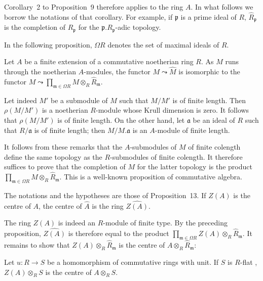 Corollary~2 to Proposition~9 therefore applies to the ring $A$. In
what follows we borrow the notations of that corollary. For example,
if $\mathfrak{p}$ is a prime ideal of $R$, $\hat R_{\mathfrak{p}}$ is
the completion of $R_{\mathfrak{p}}$ for the
$\mathfrak{p}.R_{\mathfrak{p}}$-adic topology.

In the following proposition, $\Omega R$ denotes the set of maximal
ideals of $R$.

\begin{proposition}
Let $A$ be a finite extension of a commutative noetherian ring $R$.
As $M$ runs through the noetherian $A$-modules, the functor
$M\leadsto\hat M$ is isomorphic to the functor
$M\leadsto\prod_{\mathfrak{m}\in\Omega R}M\otimes_R
\hat R_{\mathfrak{m}}$.
\end{proposition}

Let indeed $M'$ be a submodule of $M$ such that $M/M'$ is of finite
length. Then $\rho(M/M')$ is a noetherian $R$-module whose Krull
dimension is zero. It follows that $\rho(M/M')$ is of finite length.
On the other hand, let $\mathfrak{a}$ be an ideal of $R$ such that
$R/\mathfrak{a}$ is of finite length; then $M/M.\mathfrak{a}$ is an
$A$-module of finite length.

It follows from these remarks that the $A$-submodules of $M$ of finite
colength define the same topology as the $R$-submodules of finite
colength. It therefore suffices to prove that the completion of $M$
for the latter topology is the product
$\prod_{\mathfrak{m}\in\Omega R}M\otimes_R\hat R_{\mathfrak{m}}$.
This is a well-known proposition of commutative algebra.

\begin{corollary}
The notations and the hypotheses are those of Proposition~13. If
$Z(A)$ is the centre of $A$, the centre of $\hat A$ is the ring
$\widehat{Z(A)}$.
\end{corollary}

The ring $Z(A)$ is indeed an $R$-module of finite type. By the
preceding proposition, $\widehat{Z(A)}$ is therefore equal to the
product
$\prod_{\mathfrak{m}\in\Omega R}Z(A)\otimes_R\hat R_{\mathfrak{m}}$.
It remains to show that $Z(A)\otimes_R\hat R_{\mathfrak{m}}$ is the
centre of $A\otimes_R\hat R_{\mathfrak{m}}$:

\begin{lemma}
Let $u:R\to S$ be a homomorphism of commutative rings with unit. If
$S$ is $R$-flat \cite{lesieur-croisot-1}, $Z(A)\otimes_RS$ is the
centre of $A\otimes_RS$.
\end{lemma}

